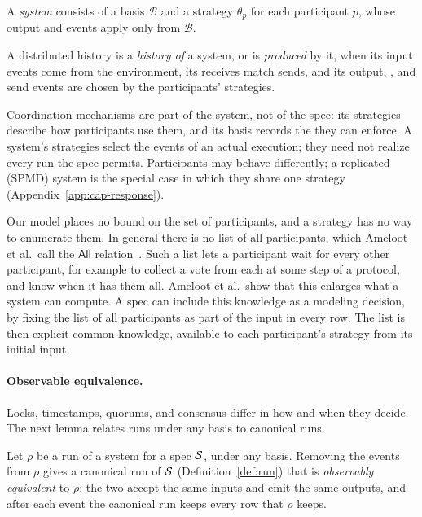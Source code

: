 \begin{definition}[System]
\label{def:system}
A \emph{system} consists of a \commitment basis $\mathcal B$ and a strategy
$\theta_p$ for each participant $p$, whose output and \commitment events apply
only \commitments from $\mathcal B$.
\end{definition}

\begin{definition}
\label{def:produced-history}
A distributed history is a \emph{history of} a system, or is \emph{produced} by
it, when its input events come from the environment, its receives match sends,
and its output, \commitment, and send events are chosen by the participants'
strategies.
\end{definition}

Coordination mechanisms are part of the system, not of the spec: its strategies
describe how participants use them, and its basis records the \commitments they
can enforce.  A system's strategies select the events of an actual execution;
they need not realize every run the spec permits.  Participants may behave
differently; a replicated (SPMD) system is the special case in which they share
one strategy (Appendix~\ref{app:cap-response}).

Our model places no bound on the set of participants, and a strategy has no way
to enumerate them.  In general there is no list of all participants, which
Ameloot et al.\ call the $\mathsf{All}$ relation~\cite{ameloot2013relational}.
Such a list lets a participant wait for every other participant, for example to
collect a vote from each at some step of a protocol, and know when it has them
all.  Ameloot et al.\ show that this enlarges what a system can compute.  A
spec can include this knowledge as a modeling decision, by fixing the list of
all participants as part of the input in every row.  The list is then explicit
common knowledge, available to each participant's strategy from its initial
input.

\paragraph{Observable equivalence.}
Locks, timestamps, quorums, and consensus differ in how and when they decide.
The next lemma relates runs under any basis to canonical runs.

\begin{lemma}
\label{lem:canonical-equivalent}
Let $\rho$ be a run of a system for a spec $\mathcal{S}$, under any \commitment
basis.  Removing the \commitment events from $\rho$ gives a canonical run of
$\mathcal{S}$ (Definition~\ref{def:run}) that is \emph{observably equivalent} to
$\rho$: the two accept the same inputs and emit the same outputs, and after each
event the canonical run keeps every row that $\rho$ keeps.
\end{lemma}

